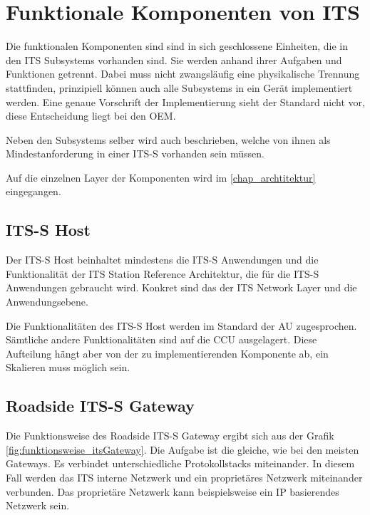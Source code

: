 \section{Funktionale Komponenten von ITS \label{funktionsweise_funktionaleKomponenten}}
Die funktionalen Komponenten sind sind in sich geschlossene Einheiten, die in den \ac{ITS} Subsystems vorhanden sind. Sie werden anhand ihrer Aufgaben und Funktionen getrennt. Dabei muss nicht zwangsläufig eine physikalische Trennung stattfinden, prinzipiell können auch alle Subsystems in ein Gerät implementiert werden. Eine genaue Vorschrift der Implementierung sieht der Standard nicht vor, diese Entscheidung liegt bei den \ac{OEM}. 

Neben den Subsystems selber wird auch beschrieben, welche von ihnen als Mindestanforderung in einer \ac{ITS-S} vorhanden sein müssen.

Auf die einzelnen Layer der Komponenten wird im \autoref{chap_archtitektur} eingegangen.   

\subsection{ITS-S Host \label{funktionsweise_ITSHost}}
Der \ac{ITS-S} Host beinhaltet mindestens die \ac{ITS-S} Anwendungen und die Funktionalität der ITS  Station Reference Architektur, die für die  \ac{ITS-S} Anwendungen gebraucht wird. Konkret sind das der \ac{ITS} Network Layer und die Anwendungsebene. 

Die Funktionalitäten des \ac{ITS-S} Host werden im Standard \cite{etsi302636-3} der \ac{AU} zugesprochen. Sämtliche andere Funktionalitäten sind auf die \ac{CCU} ausgelagert. Diese Aufteilung hängt aber von der zu implementierenden Komponente ab, ein Skalieren muss möglich sein.

\subsection{Roadside ITS-S Gateway \label{funktionsweise_RoadsideITSGateway}}
Die Funktionsweise des Roadside \ac{ITS-S} Gateway ergibt sich aus der Grafik \ref{fig:funktionsweise_itsGateway}. Die Aufgabe ist die gleiche, wie bei den meisten Gateways. Es verbindet unterschiedliche Protokollstacks miteinander. In diesem Fall werden das \ac{ITS} interne Netzwerk und ein proprietäres Netzwerk miteinander verbunden. Das proprietäre Netzwerk kann beispielsweise ein IP basierendes Netzwerk sein.

